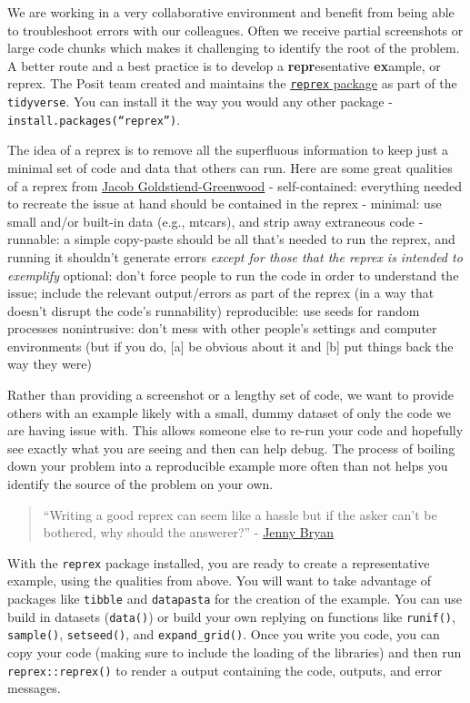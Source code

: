 \documentclass[
  letterpaper,
  DIV=11,
  numbers=noendperiod]{scrreprt}
\begin{document}
We are working in a very collaborative environment and benefit from
being able to troubleshoot errors with our colleagues. Often we receive
partial screenshots or large code chunks which makes it challenging to
identify the root of the problem. A better route and a best practice is
to develop a \textbf{repr}esentative \textbf{ex}ample, or reprex. The
Posit team created and maintains the
\href{reprex.tidyverse.org/index.html}{\texttt{reprex} package} as part
of the \texttt{tidyverse}. You can install it the way you would any
other package - \texttt{install.packages(“reprex”)}.

The idea of a reprex is to remove all the superfluous information to
keep just a minimal set of code and data that others can run. Here are
some great qualities of a reprex from
\href{https://data.library.virginia.edu/ask-better-code-questions-and-get-better-answers-with-reprex/}{Jacob
Goldstiend-Greenwood} - self-contained: everything needed to recreate
the issue at hand should be contained in the reprex - minimal: use small
and/or built-in data (e.g., mtcars), and strip away extraneous code -
runnable: a simple copy-paste should be all that's needed to run the
reprex, and running it shouldn't generate errors \emph{except for those
that the reprex is intended to exemplify} optional: don't force people
to run the code in order to understand the issue; include the relevant
output/errors as part of the reprex (in a way that doesn't disrupt the
code's runnability) reproducible: use seeds for random processes
nonintrusive: don't mess with other people's settings and computer
environments (but if you do, {[}a{]} be obvious about it and {[}b{]} put
things back the way they were)

Rather than providing a screenshot or a lengthy set of code, we want to
provide others with an example likely with a small, dummy dataset of
only the code we are having issue with. This allows someone else to
re-run your code and hopefully see exactly what you are seeing and then
can help debug. The process of boiling down your problem into a
reproducible example more often than not helps you identify the source
of the problem on your own.

\begin{quote}
``Writing a good reprex can seem like a hassle but if the asker can't be
bothered, why should the answerer?'' -
\href{https://speakerdeck.com/jennybc/reprex-help-me-help-you?slide=21}{Jenny
Bryan}
\end{quote}

With the \texttt{reprex} package installed, you are ready to create a
representative example, using the qualities from above. You will want to
take advantage of packages like \texttt{tibble} and \texttt{datapasta}
for the creation of the example. You can use build in datasets
(\texttt{data()}) or build your own replying on functions like
\texttt{runif()}, \texttt{sample()}, \texttt{setseed()}, and
\texttt{expand\_grid()}. Once you write you code, you can copy your code
(making sure to include the loading of the libraries) and then run
\texttt{reprex::reprex()} to render a output containing the code,
outputs, and error messages.
\end{document}
